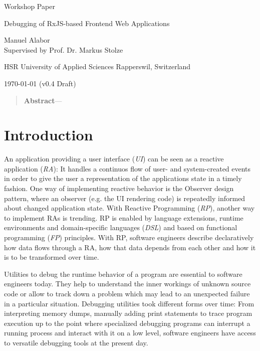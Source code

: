 \documentclass[12pt,a4paper]{article}
\newcommand{\version}{v0.4 Draft}
\begin{document}
\begin{centering}

	\Large{Workshop Paper}
	\par
	\Huge{Debugging of RxJS-based Frontend Web Applications}
	\par
	\vspace{2ex}

	\normalsize{
		Manuel Alabor\\
		Supervised by Prof. Dr. Markus Stolze\\
		\par
		\vspace{2ex}
		HSR University of Applied Sciences Rapperswil, Switzerland\\
		\par
		\vspace{2ex}
		\today{} (\version)
	}
	\par
	\vspace{2ex}

	\begin{quotation}
		\small{
			\noindent\textbf{Abstract}---
		}
		\par
		\vspace{4ex}
	\end{quotation}
\end{centering}

\section{Introduction}

An application providing a user interface (\emph{UI}) can be seen as a reactive application (\emph{RA})\cite{7827078}: It handles a continuos flow of user- and system-created events in order to give the user a representation of the applications state in a timely fashion. One way of implementing reactive behavior is the Observer design pattern\cite{gamma1995design}, where an observer (e.g. the UI rendering code) is repeatedly informed about changed application state. With Reactive Programming (\emph{RP}), another way to implement RAs is trending. RP is enabled by language extensions, runtime environments and domain-specific languages (\emph{DSL}) and based on functional programming (\emph{FP}) principles. With RP, software engineers describe declaratively how data flows through a RA, how that data depends from each other and how it is to be transformed over time.

Utilities to debug the runtime behavior of a program are essential to software engineers today. They help to understand the inner workings of unknown source code or allow to track down a problem which may lead to an unexpected failure in a particular situation. Debugging utilities took different forms over time: From interpreting memory dumps, manually adding print statements to trace program execution up to the point where specialized debugging programs can interrupt a running process and interact with it on a low level, software engineers have access to versatile debugging tools at the present day.
\end{document}
